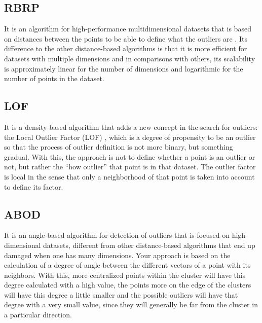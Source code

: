 \subsection{RBRP}

It is an algorithm for high-performance multidimensional datasets that is based on distances between the points to be able to define what the outliers are \cite{Ghoting2006}. Its difference to the other distance-based algorithms is that it is more efficient for datasets with multiple dimensions and in comparisons with others, its scalability is approximately linear for the number of dimensions and logarithmic for the number of points in the dataset.

\subsection{LOF}

It is a density-based algorithm that adds a new concept in the search for outliers: the
Local Outlier Factor (LOF) \cite{Breunig:2000:LID:335191.335388}, which is a degree of propensity to be an outlier so that the
process of outlier definition is not more binary, but something gradual. With this, the
approach is not to define whether a point is an outlier or not, but rather the ``how outlier''
that point is in that dataset. The outlier factor is local in the sense that only a neighborhood
of that point is taken into account to define its factor.

\subsection{ABOD}

It is an angle-based algorithm \cite{Kriegel:2008:AOD:1401890.1401946} for detection of outliers that is focused on high-dimensional datasets, different from other distance-based algorithms that end up damaged when one has many dimensions. Your approach is based on the calculation of a degree of angle between the different vectors of a point with its neighbors. With this, more centralized points within the cluster will have this degree calculated with a high value, the points more on the edge of the clusters will have this degree a little smaller and the possible outliers will have that degree with a very small value, since they will generally be far from the cluster in a particular direction.

\vspace{25pt}


